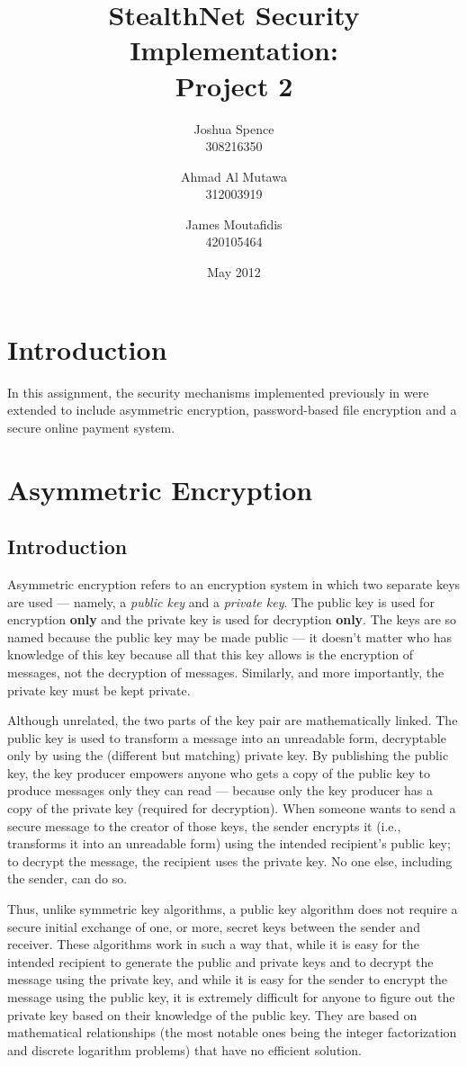 \documentclass[a4paper,11pt]{article}
\title{StealthNet Security Implementation: \\ Project 2}
\author{Joshua Spence \\ 308216350 \and Ahmad Al Mutawa \\ 312003919 \and James Moutafidis \\ 420105464}
\date{May 2012}
\begin{document}
\maketitle

\section{Introduction}
In this assignment, the security mechanisms implemented previously in 
\packageName{} were extended to include asymmetric encryption, password-based 
file encryption and a secure online payment system.

\section{Asymmetric Encryption}

\subsection{Introduction}
Asymmetric encryption refers to an encryption system in which two separate keys 
are used --- namely, a \emph{public key} and a \emph{private key}. The public 
key is used for encryption \textbf{only} and the private key is used for
decryption \textbf{only}. The keys are so named because the public key may be 
made public --- it doesn't matter who has knowledge of this key because all that
this key allows is the encryption of messages, not the decryption of messages. 
Similarly, and more importantly, the private key must be kept private.

Although unrelated, the two parts of the key pair are mathematically linked. The
public key is used to transform a message into an unreadable form, decryptable 
only by using the (different but matching) private key. By publishing the public
key, the key producer empowers anyone who gets a copy of the public key to 
produce messages only they can read --- because only the key producer has a copy
of the private key (required for decryption). When someone wants to send a 
secure message to the creator of those keys, the sender encrypts it (i.e., 
transforms it into an unreadable form) using the intended recipient's public 
key; to decrypt the message, the recipient uses the private key. No one else, 
including the sender, can do so.

Thus, unlike symmetric key algorithms, a public key algorithm does not require a
secure initial exchange of one, or more, secret keys between the sender and 
receiver. These algorithms work in such a way that, while it is easy for the 
intended recipient to generate the public and private keys and to decrypt the 
message using the private key, and while it is easy for the sender to encrypt 
the message using the public key, it is extremely difficult for anyone to figure
out the private key based on their knowledge of the public key. They are based 
on mathematical relationships (the most notable ones being the integer 
factorization and discrete logarithm problems) that have no efficient solution.
\end{document}
